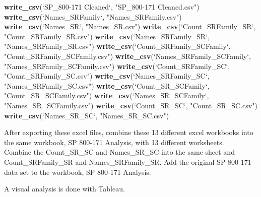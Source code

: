 \documentclass[]{article}
\newenvironment{Shaded}{\begin{snugshade}}{\end{snugshade}}
\newcommand{\KeywordTok}[1]{\textcolor[rgb]{0.13,0.29,0.53}{\textbf{#1}}}
\newcommand{\DataTypeTok}[1]{\textcolor[rgb]{0.13,0.29,0.53}{#1}}
\newcommand{\StringTok}[1]{\textcolor[rgb]{0.31,0.60,0.02}{#1}}
\newcommand{\NormalTok}[1]{#1}
\begin{document}
\begin{Shaded}
\begin{Highlighting}[]
\KeywordTok{write_csv}\NormalTok{(}\StringTok{`}\DataTypeTok{SP_800-171 Cleaned}\StringTok{`}\NormalTok{, }\StringTok{"SP_800-171 Cleaned.csv"}\NormalTok{)}
\KeywordTok{write_csv}\NormalTok{(}\StringTok{`}\DataTypeTok{Names_SRFamily}\StringTok{`}\NormalTok{, }\StringTok{"Names_SRFamily.csv"}\NormalTok{)}
\KeywordTok{write_csv}\NormalTok{(}\StringTok{`}\DataTypeTok{Names_SR}\StringTok{`}\NormalTok{, }\StringTok{"Names_SR.csv"}\NormalTok{)}
\KeywordTok{write_csv}\NormalTok{(}\StringTok{`}\DataTypeTok{Count_SRFamily_SR}\StringTok{`}\NormalTok{, }\StringTok{"Count_SRFamily_SR.csv"}\NormalTok{)}
\KeywordTok{write_csv}\NormalTok{(}\StringTok{`}\DataTypeTok{Names_SRFamily_SR}\StringTok{`}\NormalTok{, }\StringTok{"Names_SRFamily_SR.csv"}\NormalTok{)}
\KeywordTok{write_csv}\NormalTok{(}\StringTok{`}\DataTypeTok{Count_SRFamily_SCFamily}\StringTok{`}\NormalTok{, }\StringTok{"Count_SRFamily_SCFamily.csv"}\NormalTok{)}
\KeywordTok{write_csv}\NormalTok{(}\StringTok{`}\DataTypeTok{Names_SRFamily_SCFamily}\StringTok{`}\NormalTok{, }\StringTok{"Names_SRFamily_SCFamily.csv"}\NormalTok{)}
\KeywordTok{write_csv}\NormalTok{(}\StringTok{`}\DataTypeTok{Count_SRFamily_SC}\StringTok{`}\NormalTok{, }\StringTok{"Count_SRFamily_SC.csv"}\NormalTok{)}
\KeywordTok{write_csv}\NormalTok{(}\StringTok{`}\DataTypeTok{Names_SRFamily_SC}\StringTok{`}\NormalTok{, }\StringTok{"Names_SRFamily_SC.csv"}\NormalTok{)}
\KeywordTok{write_csv}\NormalTok{(}\StringTok{`}\DataTypeTok{Count_SR_SCFamily}\StringTok{`}\NormalTok{, }\StringTok{"Count_SR_SCFamily.csv"}\NormalTok{)}
\KeywordTok{write_csv}\NormalTok{(}\StringTok{`}\DataTypeTok{Names_SR_SCFamily}\StringTok{`}\NormalTok{, }\StringTok{"Names_SR_SCFamily.csv"}\NormalTok{)}
\KeywordTok{write_csv}\NormalTok{(}\StringTok{`}\DataTypeTok{Count_SR_SC}\StringTok{`}\NormalTok{, }\StringTok{"Count_SR_SC.csv"}\NormalTok{)}
\KeywordTok{write_csv}\NormalTok{(}\StringTok{`}\DataTypeTok{Names_SR_SC}\StringTok{`}\NormalTok{, }\StringTok{"Names_SR_SC.csv"}\NormalTok{)}
\end{Highlighting}
\end{Shaded}

After exporting these excel files, combine these 13 different excel
workbooks into the same workbook, SP 800-171 Analysis, with 13 different
worksheets.\\
Combine the Count\_SR\_SC and Names\_SR\_SC into the same sheet and
Count\_SRFamily\_SR and Names\_SRFamily\_SR. Add the original SP 800-171
data set to the workbook, SP 800-171 Analysis.

A visual analysis is done with Tableau.
\end{document}
